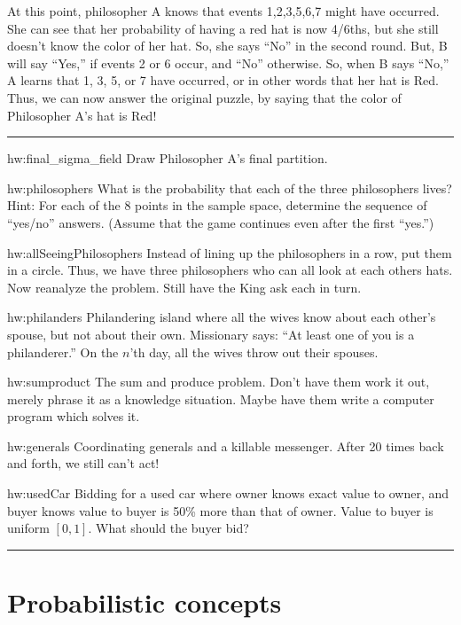 \documentclass[14pt]{extarticle}
\newenvironment{textHW}{
  \noindent\rule{\textwidth}{1pt}%
  \begin{list}{}{
      \setlength{\labelwidth}{1cm}
      \setlength{\labelsep}{0.3cm}
      \setlength{\leftmargin}{1.3cm}
      \setlength{\rightmargin}{1cm}
      \setlength{\parsep}{0.5ex plus0.2ex minus0.1ex}
      \setlength{\topsep}{1pt plus3pt minus1pt}
      \setlength{\itemsep}{0ex plus0.2ex} 
      \renewcommand{\makelabel}[1]{\label{thw:##1}{\ref{##1}}}
      \sl}}%
  {\end{list}\rule{\textwidth}{1pt}}
\newcommand{\notes}{}
\begin{document}
At this point, philosopher A knows that events 1,2,3,5,6,7 might have
occurred.  She can see that her probability of having a red hat is now
4/6ths, but she still doesn't know the color of her hat.  So, she says
``No'' in the second round.  But, B will say ``Yes,'' if events 2 or 6
occur, and ``No'' otherwise.  So, when B says ``No,'' A learns that 1,
3, 5, or 7 have occurred, or in other words that her hat is Red.  Thus,
we can now answer the original puzzle, by saying that the color of
Philosopher A's hat is Red!

\begin{textHW}
\item[hw:final_sigma_field] Draw Philosopher A's final partition.
\item[hw:philosophers] What is the probability that each of the three
  philosophers lives?  Hint: For each of the 8 points in the sample
  space, determine the sequence of ``yes/no'' answers.  (Assume that
  the game continues even after the first ``yes.'')
\item[hw:allSeeingPhilosophers]  Instead of lining up the philosophers in
  a row, put them in a circle.  Thus, we have three philosophers who
  can all look at each others hats.  Now reanalyze the problem.  Still
  have the King ask each in turn.
\item[hw:philanders] {\notes Philandering island where all the wives
    know about each other's spouse, but not about their own.
    Missionary says: ``At least one of you is a philanderer.''  On
    the $n$'th day, all the wives throw out their spouses.}
\item[hw:sumproduct] {\notes The sum and produce problem.  Don't have
    them work it out, merely phrase it as a knowledge situation.
    Maybe have them write a computer program which solves it.}
\item[hw:generals] {\notes Coordinating generals and a killable
    messenger.  After 20 times back and forth, we still can't act!}
\item[hw:usedCar] Bidding for a used car where owner knows exact value to
  owner, and buyer knows value to buyer is 50\% more than that of
  owner.  Value to buyer is uniform $[ 0,1 ]$. What should the buyer
  bid?
\end{textHW}
 
    \section{Probabilistic concepts}
\label{sec:cond_prob_partitions}
\end{document}

